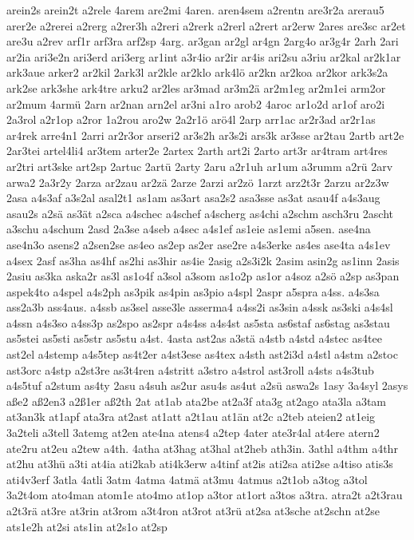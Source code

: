 {arein2s
arein2t
a2rele
4arem
are2mi
4aren.
aren4sem
a2rentn
are3r2a
arerau5
arer2e
a2rerei
a2rerg
a2rer3h
a2reri
a2rerk
a2rerl
a2rert
ar2erw
2ares
are3sc
ar2et
are3u
a2rev
arf1r
arf3ra
arf2sp
4arg.
ar3gan
ar2gl
ar4gn
2arg4o
ar3g4r
2arh
2ari
ar2ia
ari3e2n
ari3erd
ari3erg
ar1int
a3r4io
ar2ir
ar4is
ari2su
a3riu
ar2kal
ar2k1ar
ark3aue
arker2
ar2kil
2ark3l
ar2kle
ar2klo
ark4lö
ar2kn
ar2koa
ar2kor
ark3s2a
ark2se
ark3she
ark4tre
arku2
ar2les
ar3mad
ar3m2ä
ar2m1eg
ar2m1ei
arm2or
ar2mum
4armü
2arn
ar2nan
arn2el
ar3ni
a1ro
arob2
4aroc
ar1o2d
ar1of
aro2i
2a3rol
a2r1op
a2ror
1a2rou
aro2w
2a2r1ö
arö4l
2arp
arr1ac
ar2r3ad
ar2r1as
ar4rek
arre4n1
2arri
ar2r3or
arseri2
ar3s2h
ar3s2i
ars3k
ar3sse
ar2tau
2artb
art2e
2ar3tei
artel4li4
ar3tem
arter2e
2artex
2arth
art2i
2arto
art3r
ar4tram
art4res
ar2tri
art3ske
art2sp
2artuc
2artü
2arty
2aru
a2r1uh
ar1um
a3rumm
a2rü
2arv
arwa2
2a3r2y
2arza
ar2zau
ar2zä
2arze
2arzi
ar2zö
1arzt
arz2t3r
2arzu
ar2z3w
2asa
a4s3af
a3s2al
asal2t1
as1am
as3art
asa2s2
asa3sse
as3at
asau4f
a4s3aug
asau2s
a2sä
as3ät
a2sca
a4schec
a4schef
a4scherg
as4chi
a2schm
asch3ru
2ascht
a3schu
a4schum
2asd
2a3se
a4seb
a4sec
a4s1ef
as1eie
as1emi
a5sen.
ase4na
ase4n3o
asens2
a2sen2se
as4eo
as2ep
as2er
ase2re
a4s3erke
as4es
ase4ta
a4s1ev
a4sex
2asf
as3ha
as4hf
as2hi
as3hir
as4ie
2asig
a2s3i2k
2asim
asin2g
as1inn
2asis
2asiu
as3ka
aska2r
as3l
as1o4f
a3sol
a3som
as1o2p
as1or
a4soz
a2sö
a2sp
as3pan
aspek4to
a4spel
a4s2ph
as3pik
as4pin
as3pio
a4spl
2aspr
a5spra
a4ss.
a4s3sa
ass2a3b
ass4aus.
a4ssb
as3sel
asse3le
asserma4
a4ss2i
as3sin
a4ssk
as3ski
a4s4sl
a4ssn
a4s3so
a4ss3p
as2spo
as2spr
a4s4ss
a4s4st
as5sta
as6staf
as6stag
as3stau
as5stei
as5sti
as5str
as5stu
a4st.
4asta
ast2as
a3stä
a4stb
a4std
a4stec
as4tee
ast2el
a4stemp
a4s5tep
as4t2er
a4st3ese
as4tex
a4sth
ast2i3d
a4stl
a4stm
a2stoc
ast3orc
a4stp
a2st3re
as3t4ren
a4stritt
a3stro
a4strol
ast3roll
a4sts
a4s3tub
a4s5tuf
a2stum
as4ty
2asu
a4suh
as2ur
asu4s
as4ut
a2sü
aswa2s
1asy
3a4syl
2asys
aße2
aß2en3
a2ß1er
aß2th
2at
at1ab
ata2be
at2a3f
ata3g
at2ago
ata3la
a3tam
at3an3k
at1apf
ata3ra
at2ast
at1att
a2t1au
at1än
at2c
a2teb
ateien2
at1eig
3a2teli
a3tell
3atemg
at2en
ate4na
atens4
a2tep
4ater
ate3r4al
at4ere
atern2
ate2ru
at2eu
a2tew
a4th.
4atha
at3hag
at3hal
at2heb
ath3in.
3athl
a4thm
a4thr
at2hu
at3hü
a3ti
at4ia
ati2kab
ati4k3erw
a4tinf
at2is
ati2sa
ati2se
a4tiso
atis3s
ati4v3erf
3atla
4atli
3atm
4atma
4atmä
at3mu
4atmus
a2t1ob
a3tog
a3tol
3a2t4om
ato4man
atom1e
ato4mo
at1op
a3tor
at1ort
a3tos
a3tra.
atra2t
a2t3rau
a2t3rä
at3re
at3rin
at3rom
a3t4ron
at3rot
at3rü
at2sa
at3sche
at2schn
at2se
ats1e2h
at2si
ats1in
at2s1o
at2sp
}
